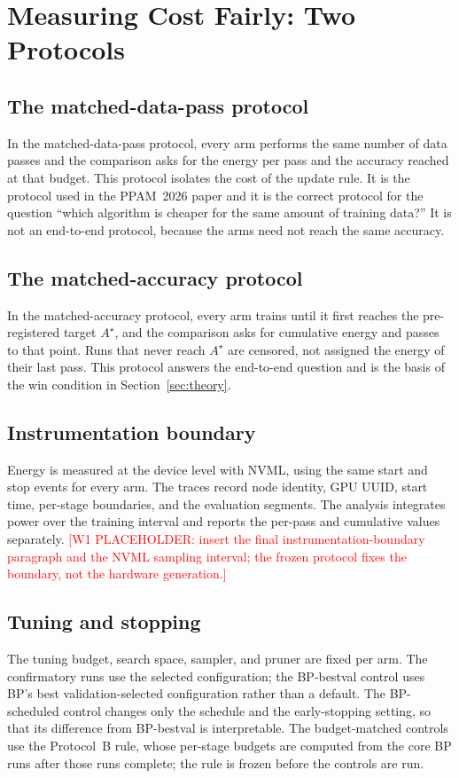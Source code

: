 \documentclass[preprint,12pt]{elsarticle}
\newcommand{\wone}[1]{\textcolor{red}{[W1 PLACEHOLDER: #1]}}
\newcommand{\ppam}{the PPAM~2026 paper}
\begin{document}
\section{Measuring Cost Fairly: Two Protocols}
\label{sec:protocols}

\subsection{The matched-data-pass protocol}
In the matched-data-pass protocol, every arm performs the same number of data
passes and the comparison asks for the energy per pass and the accuracy reached
at that budget.  This protocol isolates the cost of the update rule.  It is the
protocol used in \ppam{} and it is the correct protocol for the question
``which algorithm is cheaper for the same amount of training data?''  It is not
an end-to-end protocol, because the arms need not reach the same accuracy.

\subsection{The matched-accuracy protocol}
In the matched-accuracy protocol, every arm trains until it first reaches the
pre-registered target $A^\star$, and the comparison asks for cumulative energy
and passes to that point.  Runs that never reach $A^\star$ are censored, not
assigned the energy of their last pass.  This protocol answers the end-to-end
question and is the basis of the win condition in Section~\ref{sec:theory}.

\subsection{Instrumentation boundary}
Energy is measured at the device level with NVML, using the same start and stop
events for every arm.  The traces record node identity, GPU UUID, start time,
per-stage boundaries, and the evaluation segments.  The analysis integrates
power over the training interval and reports the per-pass and cumulative
values separately.  \wone{insert the final instrumentation-boundary paragraph
and the NVML sampling interval; the frozen protocol fixes the boundary, not the
hardware generation.}

\subsection{Tuning and stopping}
The tuning budget, search space, sampler, and pruner are fixed per arm.  The
confirmatory runs use the selected configuration; the BP-bestval control uses
BP's best validation-selected configuration rather than a default.  The
BP-scheduled control changes only the schedule and the early-stopping setting,
so that its difference from BP-bestval is interpretable.  The budget-matched
controls use the Protocol~B rule, whose per-stage budgets are computed from the
core BP runs after those runs complete; the rule is frozen before the controls
are run.
\end{document}

